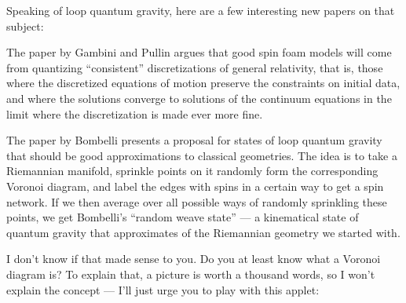 \documentclass{article}
\def\tightlist{}
\renewcommand{\texttt}[1]{%
  \begingroup
  \ttfamily
  \begingroup\lccode`~=`/\lowercase{\endgroup\def~}{/\discretionary{}{}{}}%
  \begingroup\lccode`~=`[\lowercase{\endgroup\def~}{[\discretionary{}{}{}}%
  \begingroup\lccode`~=`.\lowercase{\endgroup\def~}{.\discretionary{}{}{}}%
  \catcode`/=\active\catcode`[=\active\catcode`.=\active
  \scantokens{#1\noexpand}%
  \endgroup
}
\begin{document}
Speaking of loop quantum gravity, here are a few interesting new papers
on that subject:


The paper by Gambini and Pullin argues that good spin foam models will
come from quantizing ``consistent'' discretizations of general
relativity, that is, those where the discretized equations of motion
preserve the constraints on initial data, and where the solutions
converge to solutions of the continuum equations in the limit where the
discretization is made ever more fine.

The paper by Bombelli presents a proposal for states of loop quantum
gravity that should be good approximations to classical geometries. The
idea is to take a Riemannian manifold, sprinkle points on it randomly
form the corresponding Voronoi diagram, and label the edges with spins
in a certain way to get a spin network. If we then average over all
possible ways of randomly sprinkling these points, we get Bombelli's
``random weave state'' --- a kinematical state of quantum gravity that
approximates of the Riemannian geometry we started with.

I don't know if that made sense to you. Do you at least know what a
Voronoi diagram is? To explain that, a picture is worth a thousand
words, so I won't explain the concept --- I'll just urge you to play
with this applet:

\end{document}
